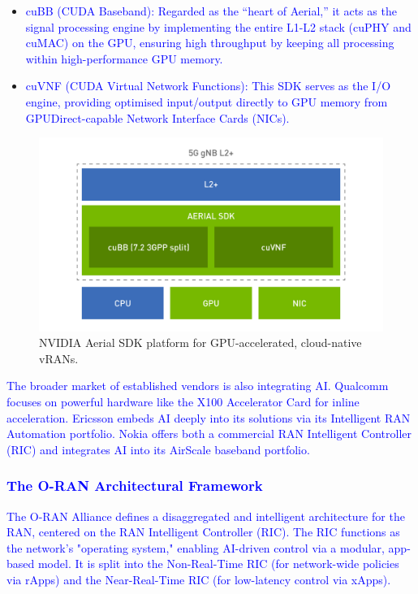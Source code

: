 \documentclass[conference]{IEEEtran}
\begin{document}
\begin{itemize}

\item \textcolor{blue}{cuBB (CUDA Baseband): Regarded as the ``heart of Aerial,'' it acts as the signal processing engine by implementing the entire L1-L2 stack (cuPHY and cuMAC) on the GPU, ensuring high throughput by keeping all processing within high-performance GPU memory.}

\item \textcolor{blue}{cuVNF (CUDA Virtual Network Functions): This SDK serves as the I/O engine, providing optimised input/output directly to GPU memory from GPUDirect-capable Network Interface Cards (NICs).}
\end{itemize}

\begin{figure}[htbp]
\centerline{\includegraphics[width=0.9\columnwidth]{images/nvidia_aerial_sdk.jpg}}
\caption{NVIDIA Aerial SDK platform for GPU-accelerated, cloud-native vRANs.}
\label{fig:nvidia_aerial_sdk}
\end{figure}

\textcolor{blue}{The broader market of established vendors is also integrating AI. Qualcomm focuses on powerful hardware like the X100 Accelerator Card for inline acceleration. Ericsson embeds AI deeply into its solutions via its Intelligent RAN Automation portfolio. Nokia offers both a commercial RAN Intelligent Controller (RIC) and integrates AI into its AirScale baseband portfolio.}

\textcolor{blue}{\subsubsection{The O-RAN Architectural Framework}
The O-RAN Alliance defines a disaggregated and intelligent architecture for the RAN, centered on the RAN Intelligent Controller (RIC). The RIC functions as the network's "operating system," enabling AI-driven control via a modular, app-based model. It is split into the Non-Real-Time RIC (for network-wide policies via rApps) and the Near-Real-Time RIC (for low-latency control via xApps).}
\end{document}
